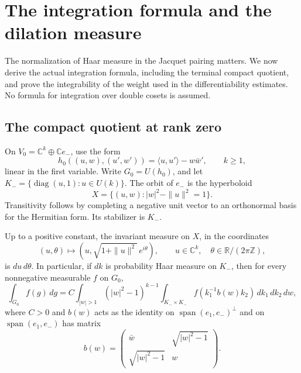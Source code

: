\section{The integration formula and the dilation measure}
\label{jg-section}

The normalization of Haar measure in the Jacquet pairing matters.
We now derive the actual integration formula, including the terminal
compact quotient, and prove the integrability of the weight used in
the differentiability estimates.  No formula for integration over
double cosets is assumed.

\subsection{The compact quotient at rank zero}

On \(V_0=\mathbb C^k\oplus\mathbb C e_-\), use the form
\[
 h_0((u,w),(u',w'))=\langle u,u'\rangle-w\bar w',
 \qquad k\geq1,
\]
linear in the first variable.  Write \(G_0=U(h_0)\), and let
\(K_-= \{\operatorname{diag}(u,1):u\in U(k)\}\).
The orbit of \(e_-\) is the hyperboloid
\[
 X=\{(u,w):|w|^2-\|u\|^2=1\}.
\]
Transitivity follows by completing a negative unit vector to an
orthonormal basis for the Hermitian form.  Its stabilizer is \(K_-\).

\begin{lemma}\label{jg-hyperboloid}
Up to a positive constant, the invariant measure on \(X\), in the
coordinates
\[
 (u,\theta)\longmapsto
       (u,\sqrt{1+\|u\|^2}\,e^{i\theta}),
 \qquad u\in\mathbb C^k,\quad \theta\in\mathbb R/(2\pi\mathbb Z),
\]
is \(du\,d\theta\).  In particular, if \(dk\) is probability Haar
measure on \(K_-\), then for every nonnegative measurable \(f\) on
\(G_0\),
\begin{equation}\label{jg-base-integration}
 \int_{G_0}f(g)\,dg
 =C\int_{|w|>1}(|w|^2-1)^{k-1}
     \int_{K_-\times K_-}
       f(k_1^{-1}b(w)k_2)\,dk_1\,dk_2\,dw ,
\end{equation}
where \(C>0\) and \(b(w)\) acts as the identity on
\(\operatorname{span}(e_1,e_-)^\perp\) and on
\(\operatorname{span}(e_1,e_-)\) has matrix
\[
 b(w)=
 \begin{pmatrix}\bar w&\sqrt{|w|^2-1}\\
                 \sqrt{|w|^2-1}&w\end{pmatrix}.
\]
\end{lemma}

